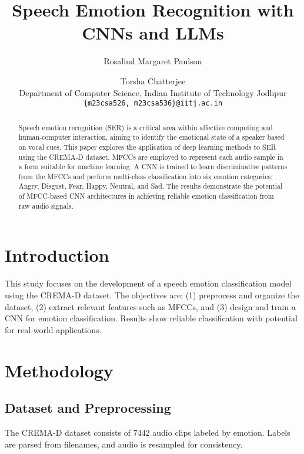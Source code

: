 \documentclass[10pt,twocolumn,letterpaper]{article}
\begin{document}
\title{Speech Emotion Recognition with CNNs and LLMs}

\author{
Rosalind Margaret Paulson \and Torsha Chatterjee \\
Department of Computer Science, Indian Institute of Technology Jodhpur\\
{\tt\small \{m23csa526, m23csa536\}@iitj.ac.in}
}

\maketitle
\thispagestyle{empty}

\begin{abstract}
Speech emotion recognition (SER) is a critical area within affective computing and human-computer interaction, aiming to identify the emotional state of a speaker based on vocal cues. This paper explores the application of deep learning methods to SER using the CREMA-D dataset. MFCCs are employed to represent each audio sample in a form suitable for machine learning. A CNN is trained to learn discriminative patterns from the MFCCs and perform multi-class classification into six emotion categories: Angry, Disgust, Fear, Happy, Neutral, and Sad. The results demonstrate the potential of MFCC-based CNN architectures in achieving reliable emotion classification from raw audio signals.
\end{abstract}

\section{Introduction}
This study focuses on the development of a speech emotion classification model using the CREMA-D dataset. The objectives are: (1) preprocess and organize the dataset, (2) extract relevant features such as MFCCs, and (3) design and train a CNN for emotion classification. Results show reliable classification with potential for real-world applications.

\section{Methodology}
\subsection{Dataset and Preprocessing}
The CREMA-D dataset consists of 7442 audio clips labeled by emotion. Labels are parsed from filenames, and audio is resampled for consistency.
\end{document}
